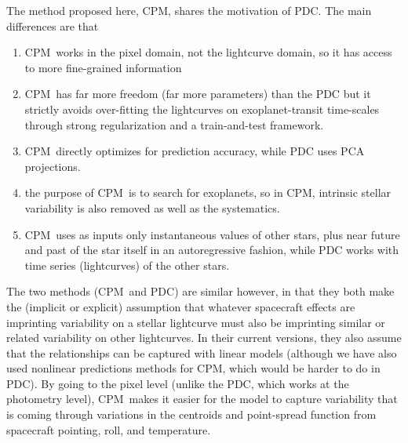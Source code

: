 \documentclass[12pt, preprint]{aastex}
\newcommand{\name}{CPM}
\begin{document}
The method proposed here, \name, shares the motivation of PDC.
The main differences are that
\begin{enumerate}
\item
\name\ works in the pixel domain, not the lightcurve domain, so it has access to more fine-grained information
\item
\name\ has far more freedom (far more parameters) than the PDC
  but it strictly avoids over-fitting the lightcurves on exoplanet-transit time-scales
  through strong regularization and a train-and-test framework.
\item 
\name\ directly optimizes for prediction accuracy, while PDC uses PCA projections.
\item
the purpose of \name\ is to search for exoplanets, so in \name, intrinsic stellar
  variability is also removed as well as the systematics.
\item 
\name\ uses as inputs only instantaneous values of other stars, plus near future and past of the star itself in an autoregressive fashion, while PDC works with time series (lightcurves) of the other stars.
\end{enumerate}



The two methods (\name\ and PDC) are similar however,
  in that they both make the (implicit or explicit) assumption that whatever spacecraft effects are imprinting variability on a stellar lightcurve
  must also be imprinting similar or related variability on other lightcurves.
In their current versions, they also assume that the relationships can be captured with linear models (although we have also used nonlinear predictions methods for \name, which would be harder to do in PDC).
By going to the pixel level (unlike the PDC, which works at the photometry level),
  \name\ makes it easier for the model to capture variability
  that is coming through variations in the centroids and point-spread function
  from spacecraft pointing, roll, and temperature.
\end{document}

